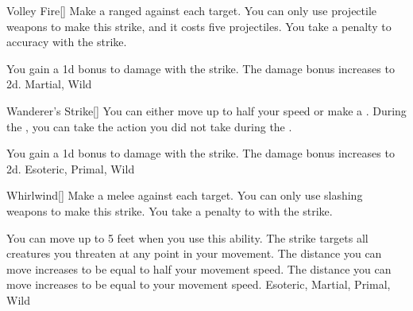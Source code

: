 \lowercase{\hypertarget{maneuver:Volley Fire}{}}\label{maneuver:Volley Fire}
\hypertarget{maneuver:Volley Fire}{}
\begin{freeability}[Rank 4]{Volley Fire}[]
Make a ranged  against each target.
You can only use projectile weapons to make this strike, and it costs five projectiles.
You take a  penalty to accuracy with the strike.

\rankline
{} You gain a \plus1d bonus to damage with the strike.
 The damage bonus increases to \plus2d.
 Martial, Wild
\end{freeability}
\vspace{0.25em}



\lowercase{\hypertarget{maneuver:Wanderer's Strike}{}}\label{maneuver:Wanderer's Strike}
\hypertarget{maneuver:Wanderer's Strike}{}
\begin{freeability}[Rank 3]{Wanderer's Strike}[]
You can either move up to half your speed or make a .
During the , you can take the action you did not take during the .

\rankline
{} You gain a \plus1d bonus to damage with the strike.
 The damage bonus increases to \plus2d.
 Esoteric, Primal, Wild
\end{freeability}
\vspace{0.25em}



\lowercase{\hypertarget{maneuver:Whirlwind}{}}\label{maneuver:Whirlwind}
\hypertarget{maneuver:Whirlwind}{}
\begin{freeability}[Rank 1]{Whirlwind}[]
Make a melee  against each target.
You can only use slashing weapons to make this strike.
You take a  penalty to  with the strike.

\rankline
{} You can move up to 5 feet when you use this ability.
The strike targets all creatures you threaten at any point in your movement.
 The distance you can move increases to be equal to half your movement speed.
 The distance you can move increases to be equal to your movement speed.
 Esoteric, Martial, Primal, Wild
\end{freeability}
\vspace{0.25em}


